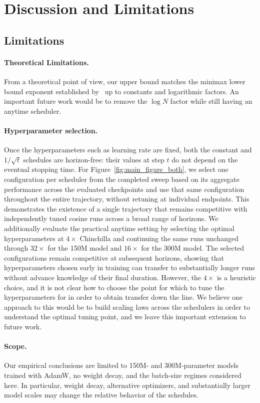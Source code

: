 \documentclass{article}
\theoremstyle{plain}
\begin{document}
\section{Discussion and Limitations}
\subsection{Limitations} 
\paragraph{Theoretical Limitations.} From a theoretical point of view, our upper bound matches the minimax lower bound exponent established by~\citet{zhang2024optimality} up to constants and logarithmic factors. An important future work would be to remove the $\log N$ factor while still having an anytime scheduler. 
\paragraph{Hyperparameter selection.} Once the hyperparameters such as learning rate are fixed, both the constant and \(1/\sqrt{t}\) schedules are horizon-free: their values at step \(t\) do not depend on the eventual stopping time. For Figure~\ref{fig:main_figure_both}, we select one configuration per scheduler from the completed sweep based on its aggregate performance across the evaluated checkpoints and use that same configuration throughout the entire trajectory, without retuning at individual endpoints. This demonstrates the existence of a single trajectory that remains competitive with independently tuned cosine runs across a broad range of horizons. We additionally evaluate the practical anytime setting by selecting the optimal hyperparameters at \(4\times\) Chinchilla and continuing the same runs unchanged through \(32\times\) for the 150M model and \(16\times\) for the 300M model. The selected configurations remain competitive at subsequent horizons, showing that hyperparameters chosen early in training can transfer to substantially longer runs without advance knowledge of their final duration. However, the $4 \times$ is a heuristic choice, and it is not clear how to choose the point for which to tune the hyperparameters for in order to obtain transfer down the line. We believe one approach to this would be to build scaling laws across the schedulers in order to understand the optimal tuning point, and we leave this important extension to future work.
\paragraph{Scope.} Our empirical conclusions are limited to 150M- and 300M-parameter models trained with AdamW, no weight decay, and the batch-size regimes considered here. In particular, weight decay, alternative optimizers, and substantially larger model scales may change the relative behavior of the schedules.
\end{document}
